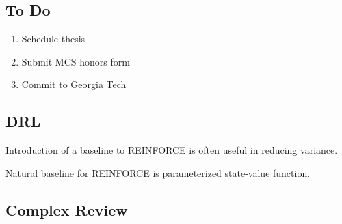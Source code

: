 \documentclass[11pt]{article}
\theoremstyle{remark}
\begin{document}
\subsection{To Do}

\begin{enumerate}
	\item Schedule thesis 
	\item Submit MCS honors form
	\item Commit to Georgia Tech
\end{enumerate}

\subsection{DRL}

Introduction of a baseline to REINFORCE is often useful in reducing variance.

Natural baseline for REINFORCE is parameterized state-value function. 

\subsection{Complex Review}
\end{document}
